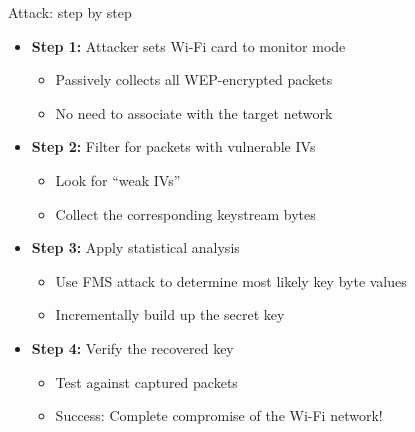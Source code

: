 \documentclass[aspectratio=169, lualatex, handout]{beamer}
\begin{document}
\begin{frame}{Attack: step by step}
	\begin{itemize}[<+->]
		\item \textbf{Step 1:} Attacker sets Wi-Fi card to monitor mode
		      \begin{itemize}[<+->]
			      \item Passively collects all WEP-encrypted packets
			      \item No need to associate with the target network
		      \end{itemize}
		\item \textbf{Step 2:} Filter for packets with vulnerable IVs
		      \begin{itemize}[<+->]
			      \item Look for ``weak IVs''
			      \item Collect the corresponding keystream bytes
		      \end{itemize}
		\item \textbf{Step 3:} Apply statistical analysis
		      \begin{itemize}[<+->]
			      \item Use FMS attack to determine most likely key byte values
			      \item Incrementally build up the secret key
		      \end{itemize}
		\item \textbf{Step 4:} Verify the recovered key
		      \begin{itemize}[<+->]
			      \item Test against captured packets
			      \item Success: Complete compromise of the Wi-Fi network!
		      \end{itemize}
	\end{itemize}
\end{frame}
\end{document}
